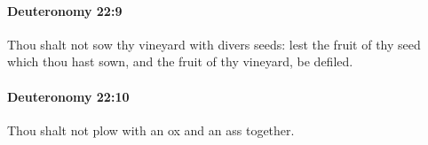 		\paragraph{Deuteronomy 22:9} %
			\label{DEUTERONOMY-22-9}

			Thou shalt not sow thy vineyard with divers seeds: lest the fruit of thy seed which thou hast sown, and the fruit of thy vineyard, be defiled.


		\paragraph{Deuteronomy 22:10} %
			\label{DEUTERONOMY-22-10}

			Thou shalt not plow with an ox and an ass together.


